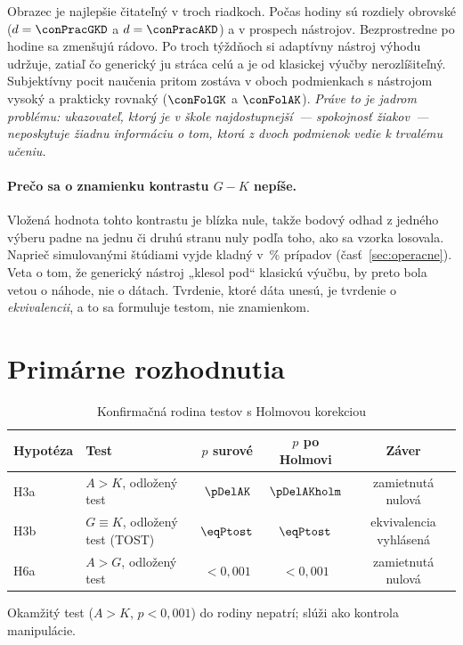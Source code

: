 Obrazec je najlepšie čitateľný v troch riadkoch. Počas hodiny sú rozdiely obrovské ($d=\conPracGKD$ a $d=\conPracAKD$) a v prospech nástrojov. Bezprostredne po hodine sa zmenšujú rádovo. Po troch týždňoch si adaptívny nástroj výhodu udržuje, zatiaľ čo generický ju stráca celú a je od klasickej výučby nerozlíšiteľný. Subjektívny pocit naučenia pritom zostáva v oboch podmienkach s nástrojom vysoký a prakticky rovnaký ($\conFolGK$ a $\conFolAK$). \emph{Práve to je jadrom problému: ukazovateľ, ktorý je v škole najdostupnejší~--- spokojnosť žiakov~--- neposkytuje žiadnu informáciu o tom, ktorá z dvoch podmienok vedie k trvalému učeniu.}

\paragraph{Prečo sa o znamienku kontrastu $G-K$ nepíše.} Vložená hodnota tohto kontrastu je blízka nule, takže bodový odhad z jedného výberu padne na jednu či druhú stranu nuly podľa toho, ako sa vzorka losovala. Naprieč \valReps{} simulovanými štúdiami vyjde kladný v \valSignFlip\,\% prípadov (časť~\ref{sec:operacne}). Veta o tom, že generický nástroj „klesol pod“ klasickú výučbu, by preto bola vetou o náhode, nie o dátach. Tvrdenie, ktoré dáta unesú, je tvrdenie o \emph{ekvivalencii}, a to sa formuluje testom, nie znamienkom.

\section{Primárne rozhodnutia}

\begin{table}[H]
\centering
\caption{Konfirmačná rodina testov s Holmovou korekciou}
\label{tab:primarne}
\small
\begin{tabular}{@{}llccc@{}}
\toprule
\textbf{Hypotéza} & \textbf{Test} & \textbf{$p$ surové} & \textbf{$p$ po Holmovi} & \textbf{Záver} \\
\midrule
H3a & $A>K$, odložený test     & $\pDelAK$ & $\pDelAKholm$ & zamietnutá nulová \\
H3b & $G\equiv K$, odložený test (TOST) & $\eqPtost$ & $\eqPtost$ & ekvivalencia vyhlásená \\
H6a & $A>G$, odložený test     & $<0{,}001$ & $<0{,}001$ & zamietnutá nulová \\
\bottomrule
\end{tabular}
\vspace{2pt}
\footnotesize Okamžitý test ($A>K$, $p<0{,}001$) do rodiny nepatrí; slúži ako kontrola manipulácie.
\end{table}

